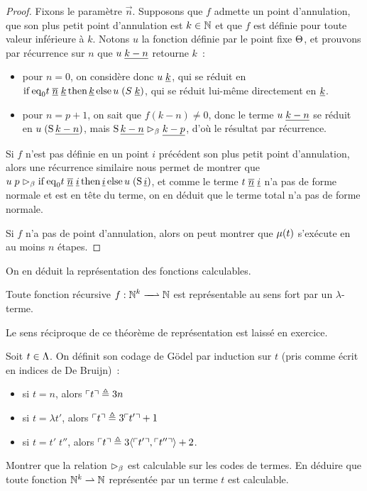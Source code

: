 \begin{proof}
  Fixons le paramètre $\vec n$.
  Supposons que $f$ admette un point d'annulation, que son plus petit
  point d'annulation est $k \in \mathbb N$ et que $f$ est définie pour toute valeur
  inférieure à $k$. Notons $u$ la fonction définie par
  le point fixe $\Theta$, et prouvons par récurrence sur $n$ que
  $u\;\underline{k-n}$ retourne $k$~:
  \begin{itemize}
  \item pour $n = 0$, on considère donc $u\;\underline{k}$, qui se réduit en
    $\operatorname{if}\mathrm{eq}_0 t\;\underline{\overline{n}}\;\underline{k}\operatorname{then} \underline{k}\operatorname{else}
    u\;(S\;\underline{k})$, qui se réduit lui-même directement en
    $\underline{k}$.
  \item pour $n = p + 1$, on sait que $f(k-n)\neq 0$, donc
    le terme $u\;\underline{k-n}$ se réduit en
    $u\;(\operatorname{S} \underline{k-n})$, mais $\operatorname{S} \underline{k-n} \mathrel{\rhd_{\beta}} \underline{k-p}$, d'où
    le résultat par récurrence.
  \end{itemize}

  Si $f$ n'est pas définie en un point $i$ précédent son plus petit point
  d'annulation, alors une récurrence similaire nous permet de montrer que
  $u\;p \mathrel{\rhd_{\beta}} \operatorname{if}\mathrm{eq}_0 t\;\underline{\overline{n}}\;\underline{i}\operatorname{then} \underline{i} \operatorname{else}
  u\;(\operatorname{S} \underline{i})$, et comme le terme $t\;\underline{\overline{n}}\;\underline{i}$ n'a
  pas de forme normale et est en tête du terme, on en déduit que le terme
  total n'a pas de forme normale.

  Si $f$ n'a pas de point d'annulation, alors on peut montrer que
  $\mathbin{\mu}(t)$ s'exécute en au moins $n$ étapes.
\end{proof}

On en déduit la représentation des fonctions calculables.

\begin{theorem}
  Toute fonction récursive $\makeFunNamePartial{f}{\bN^k}{\bN}$ est
  représentable au sens fort par un $\lambda$-terme.
\end{theorem}

\noindent
Le sens réciproque de ce théorème de représentation est laissé en exercice.

\begin{exercise}
  Soit $t\in\Lambda$. On définit son codage de Gödel par induction sur $t$
  (pris comme écrit en indices de De Bruijn)~:
  \begin{itemize}
  \item si $t = n$, alors $\ulcorner t\urcorner \triangleq 3n$
  \item si $t = \lambda t'$, alors $\ulcorner t\urcorner \triangleq 3\ulcorner t'\urcorner + 1$
  \item si $t = t'\;t''$, alors
    $\ulcorner t\urcorner \triangleq 3\langle \ulcorner t'\urcorner,\ulcorner t''\urcorner\rangle + 2$.
  \end{itemize}

  Montrer que la relation $\mathrel{\rhd_{\beta}}$ est calculable sur les codes de termes.
  En déduire que toute fonction $\mathbb N^k\rightharpoonup \mathbb N$ représentée par un
  terme $t$ est calculable.
\end{exercise}

